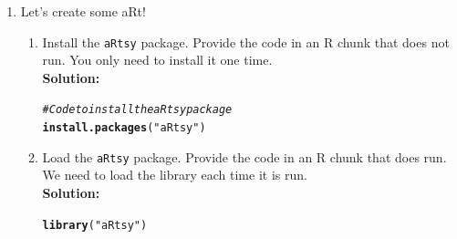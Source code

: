 \documentclass{article}\usepackage[]{graphicx}\usepackage[]{xcolor}
\makeatletter
\newcommand{\hlsng}[1]{\textcolor[rgb]{0.192,0.494,0.8}{#1}}%
\newcommand{\hlcom}[1]{\textcolor[rgb]{0.678,0.584,0.686}{\textit{#1}}}%
\newcommand{\hldef}[1]{\textcolor[rgb]{0.345,0.345,0.345}{#1}}%
\newcommand{\hlkwd}[1]{\textcolor[rgb]{0.737,0.353,0.396}{\textbf{#1}}}%
\newenvironment{kframe}{%
 \def\at@end@of@kframe{}%
 \ifinner\ifhmode%
  \def\at@end@of@kframe{\end{minipage}}%
  \begin{minipage}{\columnwidth}%
 \fi\fi%
 \def\FrameCommand##1{\hskip\@totalleftmargin \hskip-\fboxsep
 \colorbox{shadecolor}{##1}\hskip-\fboxsep
     \hskip-\linewidth \hskip-\@totalleftmargin \hskip\columnwidth}%
 \MakeFramed {\advance\hsize-\width
   \@totalleftmargin\z@ \linewidth\hsize
   \@setminipage}}%
 {\par\unskip\endMakeFramed%
 \at@end@of@kframe}
\newenvironment{knitrout}{}{} %
\makeatother
\begin{document}
\begin{enumerate}
\item Let's create some aRt! 
\begin{enumerate}
  \item Install the \texttt{aRtsy} package. Provide the code in an R chunk   that does 
  not run. You only need to install it one time.\\
\textbf{Solution:}
\begin{knitrout}\scriptsize
{}\color{fgcolor}\begin{kframe}
\begin{alltt}
\hlcom{# Code to install the aRtsy package}
\hlkwd{install.packages}\hldef{(}\hlsng{"aRtsy"}\hldef{)}
\end{alltt}
\end{kframe}
\end{knitrout}
  \item Load the \texttt{aRtsy} package. Provide the code in an R chunk that does run. 
  We need to load the library each time it is run.\\
\textbf{Solution:}
\begin{knitrout}\scriptsize
{}\color{fgcolor}\begin{kframe}
\begin{alltt}
\hlkwd{library}\hldef{(}\hlsng{"aRtsy"}\hldef{)}
\end{alltt}
\end{kframe}
\end{knitrout}

\end{enumerate}
\end{enumerate}
\end{document}
